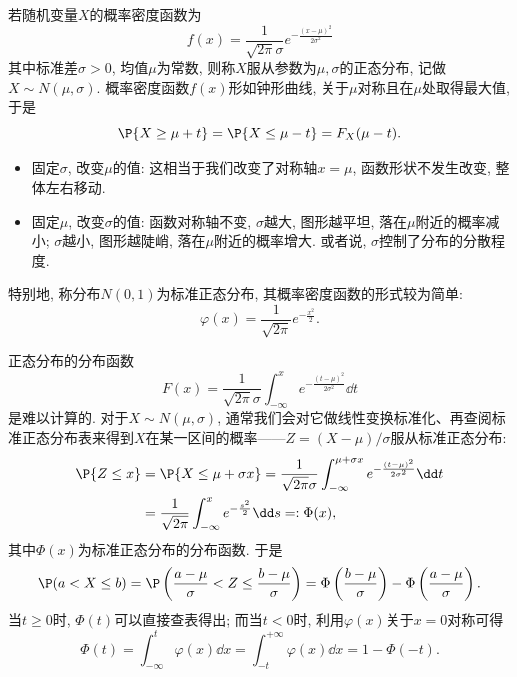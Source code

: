 \documentclass[11pt]{ctexart}
\begin{document}
若随机变量$X$的概率密度函数为
\begin{equation*}
	f(x) = \frac{1}{\sqrt{2 \pi} \sigma} e^{- \frac{(x-\mu)^2}{2 \sigma^2}}
\end{equation*}
其中标准差$\sigma > 0$, 均值$\mu$为常数, 则称$X$服从参数为$\mu, \sigma$的正态分布, 记做$X \sim N(\mu, \sigma)$. 
概率密度函数$f(x)$形如钟形曲线, 关于$\mu$对称且在$\mu$处取得最大值, 于是
\begin{equation*}
	\P\{X \geq \mu + t\} = \P\{X \leq \mu - t\} = F_X(\mu - t). 
\end{equation*}
\begin{itemize}
	\item 固定$\sigma$, 改变$\mu$的值: 这相当于我们改变了对称轴$x = \mu$, 函数形状不发生改变, 整体左右移动. 
	\item 固定$\mu$, 改变$\sigma$的值: 函数对称轴不变, $\sigma$越大, 图形越平坦, 落在$\mu$附近的概率减小; $\sigma$越小, 图形越陡峭, 落在$\mu$附近的概率增大. 或者说, $\sigma$控制了分布的分散程度. 
\end{itemize}
特别地, 称分布$N(0, 1)$为{\keben 标准正态分布}, 其概率密度函数的形式较为简单: 
\begin{equation*}
	\varphi(x) = \frac{1}{\sqrt{2 \pi}} e^{- \frac{x^2}{2}}. 
\end{equation*}


正态分布的分布函数
\begin{equation*}
	F(x) = \frac{1}{\sqrt{2 \pi} \sigma} \int_{- \infty}^{x} e^{- \frac{(t-\mu)^2}{2 \sigma^2}} \dd t
\end{equation*}
是难以计算的. 
对于$X \sim N(\mu, \sigma)$, 通常我们会对它做线性变换{\keben 标准化}、再查阅标准正态分布表来得到$X$在某一区间的概率——$Z = (X - \mu) / \sigma$服从标准正态分布: 
\begin{align*}
	\P\{Z \leq x\}
	&= \P\{ X \leq \mu + \sigma x\}
	= \frac{1}{\sqrt{2 \pi} \sigma} \int_{- \infty}^{\mu + \sigma x} e^{- \frac{(t-\mu)^2}{2 \sigma^2}} \dd t \\
	&= \frac{1}{\sqrt{2 \pi}} \int_{- \infty}^{x} e^{- \frac{s^2}{2}} \dd s
	=: \Phi(x), 
\end{align*}
其中$\Phi(x)$为标准正态分布的分布函数. 
于是
\begin{equation*}
	\P(a < X \leq b)
	= \P\left(\frac{a - \mu}{\sigma} < Z \leq \frac{b - \mu}{\sigma} \right)
	= \Phi\left(\frac{b - \mu}{\sigma} \right) - \Phi\left(\frac{a - \mu}{\sigma}\right). 
\end{equation*}
当$t \geq 0$时, $\Phi(t)$可以直接查表得出; 而当$t < 0$时, 利用$\varphi(x)$关于$x = 0$对称可得
\begin{equation*}
	\Phi(t) 
	= \int_{-\infty}^t \varphi(x) \dd x 
	= \int_{-t}^{+\infty} \varphi(x) \dd x 
	= 1 - \Phi(-t). 
\end{equation*}
\end{document}
